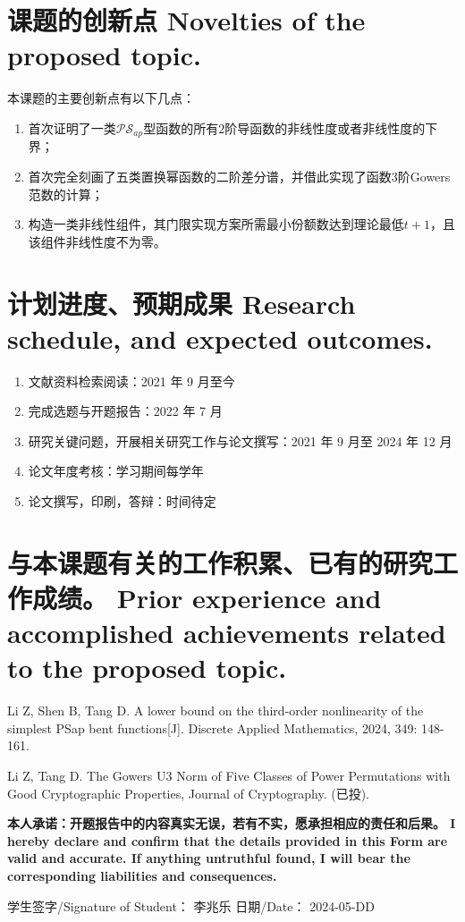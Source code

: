 \documentclass[a4paper,zihao=-4,AutoFakeBold]{ctexart}
\begin{document}
\section{课题的创新点 Novelties of the proposed topic.}
本课题的主要创新点有以下几点：
\begin{enumerate}[label=(\arabic{*})]
    \item 首次证明了一类$\mathcal{PS}_{ap}$型函数的所有$2$阶导函数的非线性度或者非线性度的下界；
    \item 首次完全刻画了五类置换幂函数的二阶差分谱，并借此实现了函数3阶Gowers范数的计算；
    \item 构造一类非线性组件，其门限实现方案所需最小份额数达到理论最低$t+1$，且该组件非线性度不为零。
\end{enumerate}

\section{计划进度、预期成果 Research schedule, and expected outcomes.}
\begin{enumerate}[label=\arabic{*})]
    \item 文献资料检索阅读：2021 年 9 月至今
    \item 完成选题与开题报告：2022 年 7 月
    \item 研究关键问题，开展相关研究工作与论文撰写：2021 年 9 月至 2024 年 12 月
    \item 论文年度考核：学习期间每学年
    \item 论文撰写，印刷，答辩：时间待定
\end{enumerate}


\section{与本课题有关的工作积累、已有的研究工作成绩。
  Prior experience and accomplished achievements
  related to the proposed topic.}
\begin{enumerate}[label={[\arabic{*}]}]
    \item Li Z, Shen B, Tang D. A lower bound on the third-order nonlinearity of the simplest PSap bent functions[J]. Discrete Applied Mathematics, 2024, 349: 148-161.
    \item Li Z, Tang D. The Gowers U3 Norm of Five Classes of Power Permutations with Good Cryptographic Properties, Journal of Cryptography. (已投). 
\end{enumerate}



\vspace{\baselineskip}

\bfseries\fangsong
\noindent
本人承诺：开题报告中的内容真实无误，若有不实，愿承担相应的责任和后果。
I hereby declare and confirm that the details
provided in this Form are valid and accurate.
If anything untruthful found,
I will bear the corresponding liabilities and consequences.

\vspace{\baselineskip}

\noindent
学生签字/Signature of Student： 李兆乐
\hfill
日期/Date： 2024-05-DD
\end{document}
